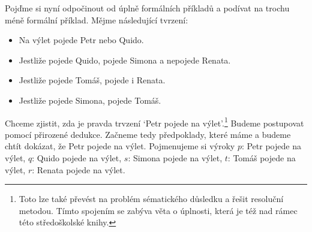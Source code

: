 \begin{example}
  Pojďme si nyní odpočinout od úplně formálních příkladů a podívat na trochu méně formální příklad. Mějme následující tvrzení:
  \begin{itemize}
    \item Na výlet pojede Petr nebo Quido.
    \item Jestliže pojede Quido, pojede Simona a nepojede Renata.
    \item Jestliže pojede Tomáš, pojede i Renata.
    \item Jestliže pojede Simona, pojede Tomáš.
  \end{itemize}
  Chceme zjistit, zda je pravda trvzení `Petr pojede na výlet'.\footnote{Toto lze také převést na problém sématického důsledku a řešit resoluční metodou. Tímto spojením se zabýva věta o úplnosti, která je též nad rámec této středoškolské knihy.} Budeme postupovat pomocí přirozené dedukce. Začneme tedy předpoklady, které máme a budeme chtít dokázat, že Petr pojede na výlet. Pojmenujeme si výroky $p$: Petr pojede na výlet, $q$: Quido pojede na výlet, $s$: Simona pojede na výlet, $t$: Tomáš pojede na výlet, $r$: Renata pojede na výlet.


\end{example}
